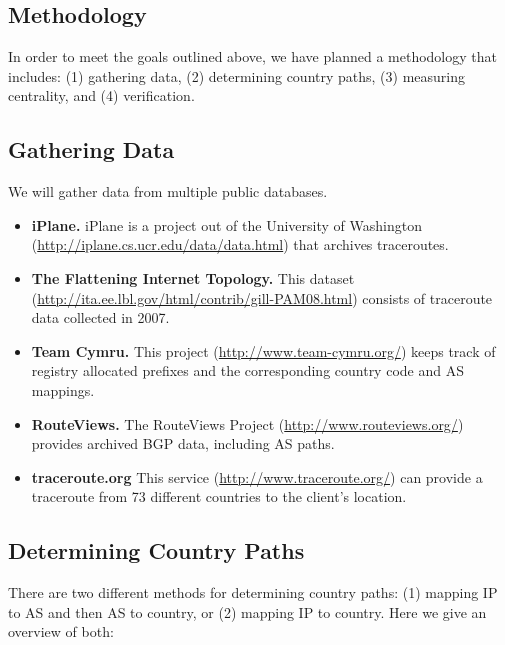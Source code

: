 \documentclass[12pt, letterpaper]{article}
\begin{document}
\begin{spacing}{.95}
\section{Methodology}

In order to meet the goals outlined above, we have planned a methodology that includes: (1) gathering data, (2) determining country paths, (3) measuring centrality, and (4) verification.

\subsection{Gathering Data}

We will gather data from multiple public databases.

\begin{itemize} [noitemsep]

\item {\bf iPlane.}  iPlane is a project out of the University of Washington (\url{http://iplane.cs.ucr.edu/data/data.html}) that archives traceroutes.

\item {\bf The Flattening Internet Topology.}  This dataset (\url{http://ita.ee.lbl.gov/html/contrib/gill-PAM08.html}) consists of traceroute data collected in 2007.

\item {\bf Team Cymru.}  This project (\url{http://www.team-cymru.org/}) keeps track of registry allocated prefixes and the corresponding country code and AS mappings.

\item {\bf RouteViews.}  The RouteViews Project (\url{http://www.routeviews.org/}) provides archived BGP data, including AS paths.

\item {\bf traceroute.org} This service (\url{http://www.traceroute.org/}) can provide a traceroute from 73 different countries to the client's location.

\end{itemize}

\subsection{Determining Country Paths}

There are two different methods for determining country paths: (1) mapping IP to AS and then AS to country, or (2) mapping IP to country.  Here we give an overview of both:


\end{spacing}
\end{document}

